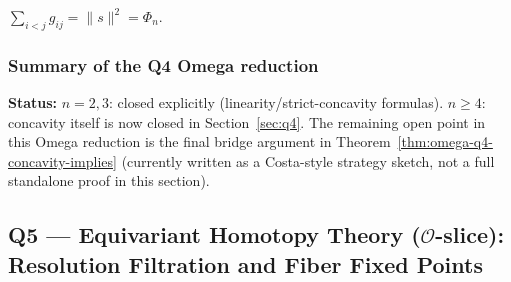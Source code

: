 \begin{lemma}\label{lem:omega-q4-g1}
$\sum_{i<j} g_{ij}=\|s\|^2=\Phi_n$.
\end{lemma}

\subsubsection{Summary of the Q4 Omega reduction}

\begin{center}
\end{center}

\medskip\noindent
\textbf{Status:}
$n=2,3$: closed explicitly (linearity/strict-concavity formulas).
$n\ge 4$: concavity itself is now closed in Section~\ref{sec:q4}.
The remaining open point in this Omega reduction is the final
bridge argument in Theorem~\ref{thm:omega-q4-concavity-implies}
(currently written as a Costa-style strategy sketch, not a full
standalone proof in this section).


\subsection{Q5 --- Equivariant Homotopy Theory ($\mathcal O$-slice):
  Resolution Filtration and Fiber Fixed Points}
\label{ss:omega-q5}


